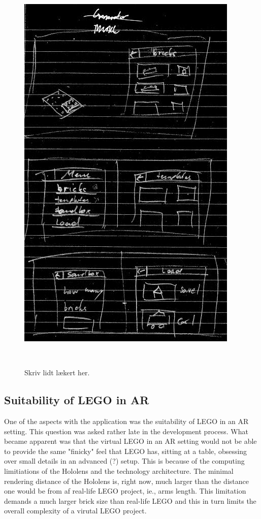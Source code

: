 \begin{figure}
\centering
  \includegraphics[width=0.6\columnwidth]{figures/Menu/menu1.png}
  \caption{Skriv lidt lækert her. }~\label{fig:genboard}
\end{figure}

\subsection{Suitability of LEGO in AR}
One of the aspects with the application was the suitability of LEGO in an AR setting. This question was asked rather late in the development process. What became apparent was that the virtual LEGO in an AR setting would not be able to provide the same "finicky" feel that LEGO has, sitting at a table, obsessing over small details in an advanced (?) setup. This is because of the computing limitiations of the Hololens and the technology architecture. The minimal rendering distance of the Hololens is, right now, much larger than the distance one would be from af real-life LEGO project, ie., arms length. This limitation demands a much larger brick size than real-life LEGO and this in turn limits the overall complexity of a virutal LEGO project. 